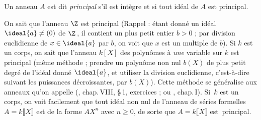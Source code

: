 \documentclass[11pt, %
  title in boldface,
  theorem in new line,
  theorem numbering = section,
  number theorems separately,
  simple name,
]{beaulivre}
\begin{document}
    \begin{definition}
        Un anneau \( A \) est dit \emph{principal} s'il est intègre et si tout idéal de \( A \) est principal.
    \end{definition}

    On sait que l'anneau \( \Z \) est principal (Rappel : étant donné un idéal \( \ideal{a} \neq (0) \) de \( \Z \)\,, il contient un plus petit entier \( b > 0 \) ; par division euclidienne de \( x \in \ideal{a} \) par \( b \), on voit que \( x \) est un multiple de \( b \)). Si \( k \) est un corps, on sait que l'anneau \( k[X] \) des polynômes à \emph{une} variable sur \( k \) est principal (même méthode ; prendre un polynôme non nul \( b(X) \) de plus petit degré de l'idéal donné \( \ideal{a} \), et utiliser la division euclidienne, c'est-à-dire suivant les puissances décroissantes, par \( b(X) \)). Cette méthode se généralise aux anneaux qu'on appelle  (\cite{bourbaki1}, chap.\,VIII, \S\,1, exercices ; ou \cite{zariski1958}, chap.\,I). Si~\( k \) est un corps, on voit facilement que tout idéal non nul de l'anneau de séries formelles \( A = k\lBrack X \rBrack \) est de la forme \( AX^n \) avec \( n \geqslant 0 \), de sorte que \( A = k\lBrack X \rBrack \) est~principal.
\end{document}
